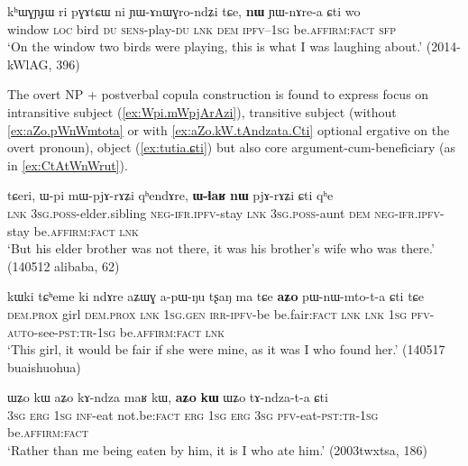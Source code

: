 \documentclass[oneside,a4paper,11pt]{article}
\begin{document}
 \begin{exe}
\ex \label{ex:nW.YWnArea}
\gll  kʰɯɣɲɟɯ ri pɣɤtɕɯ ni ɲɯ-ɤnɯɣro-ndʑi tɕe, \textbf{nɯ} ɲɯ-nɤre-a ɕti wo  \\
window \textsc{loc} bird \textsc{du} \textsc{sens}-play-\textsc{du} \textsc{lnk} \textsc{dem} \textsc{ipfv}--\textsc{1sg}  be.\textsc{affirm}:\textsc{fact} \textsc{sfp} \\
\glt `On the window two birds were playing, this is what I was laughing about.' (2014-kWlAG, 396)
\end{exe}


The overt NP + postverbal copula construction is found to express focus on intransitive subject (\ref{ex:Wpi.mWpjArAzi}), transitive subject (without \ref{ex:aZo.pWnWmtota} or with \ref{ex:aZo.kW.tAndzata.Cti} optional ergative on the overt pronoun), object (\ref{ex:tutia.ɕti}) but also core argument-cum-beneficiary (as in \ref{ex:CtAtWnWrut}).

\begin{exe}
\ex \label{ex:Wpi.mWpjArAzi}
\gll tɕeri, ɯ-pi mɯ-pjɤ-rɤʑi qʰendɤre,  \textbf{ɯ-ɬaʁ} \textbf{nɯ} pjɤ-rɤʑi ɕti qʰe  \\
\textsc{lnk} \textsc{3sg}.\textsc{poss}-elder.sibling \textsc{neg}-\textsc{ifr}.\textsc{ipfv}-stay \textsc{lnk} \textsc{3sg}.\textsc{poss}-aunt \textsc{dem} \textsc{neg}-\textsc{ifr}.\textsc{ipfv}-stay be.\textsc{affirm}:\textsc{fact} \textsc{lnk} \\
\glt  `But his elder brother was not there, it was his brother's wife who was there.' (140512 alibaba, 62)
\end{exe}

\begin{exe}
\ex \label{ex:aZo.pWnWmtota}
\gll  kɯki tɕʰeme ki ndɤre aʑɯɣ a-pɯ-ŋu tʂaŋ ma tɕe \textbf{aʑo} pɯ-nɯ-mto-t-a ɕti tɕe \\
\textsc{dem}.\textsc{prox} girl  \textsc{dem}.\textsc{prox} \textsc{lnk} \textsc{1sg}.\textsc{gen} \textsc{irr}-\textsc{ipfv}-be be.fair:\textsc{fact} \textsc{lnk} \textsc{lnk} \textsc{1sg} \textsc{pfv}-\textsc{auto}-see-\textsc{pst}:\textsc{tr}-\textsc{1sg} be.\textsc{affirm}:\textsc{fact} \textsc{lnk} \\
\glt `This girl, it would be fair if she were mine, as it was I who found her.' (140517 buaishuohua)
\end{exe}

\begin{exe}
\ex \label{ex:aZo.kW.tAndzata.Cti}
\gll ɯʑo kɯ aʑo kɤ-ndza maʁ kɯ,  \textbf{aʑo} \textbf{kɯ} ɯʑo tɤ-ndza-t-a ɕti \\
\textsc{3sg} \textsc{erg} \textsc{1sg} \textsc{inf}-eat not.be:\textsc{fact} \textsc{erg} \textsc{1sg} \textsc{erg} \textsc{3sg} \textsc{pfv}-eat-\textsc{pst}:\textsc{tr}-\textsc{1sg}  be.\textsc{affirm}:\textsc{fact} \\
\glt   `Rather than me being eaten by him, it is I who ate him.' (2003twxtsa, 186)
\end{exe}
\end{document}
